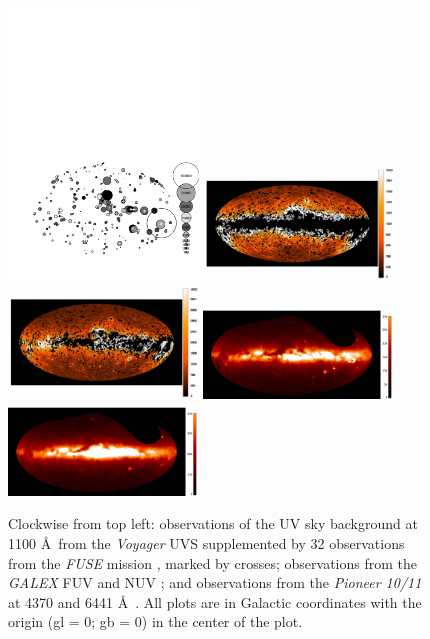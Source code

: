 \documentclass{iau}
\newcommand{\voyager}{{\it Voyager }}
\begin{document}
\begin{figure}[t]
\begin{center}
 \includegraphics[width=0.45\textwidth]{fuv_back.pdf} 
 \includegraphics[width=0.45\textwidth]{galex_fuv.pdf} 
 \includegraphics[width=0.45\textwidth]{galex_nuv.pdf} 
 \includegraphics[width=0.45\textwidth]{pioneer_b.pdf} 
 \includegraphics[width=0.45\textwidth]{pioneer_r.pdf} 
\caption{Clockwise from top left: observations of the UV sky background at 1100 \AA\ from the \voyager UVS \citep{Murthyvoy_all} supplemented by 32 observations from the {\it FUSE} mission \citep{Murthy_sahnow2004}, marked by crosses; observations from the {\it GALEX} FUV and NUV \citep{Murthy2014apj}; and observations from the {\it Pioneer 10/11} at 4370 and 6441 \AA\ \citep{Gordon_Pioneer1998}. All plots are in Galactic coordinates with the origin (gl = 0; gb = 0) in the center of the plot. }
  \label{Fig:euv_bkgd}
\end{center}
\end{figure}
\end{document}
